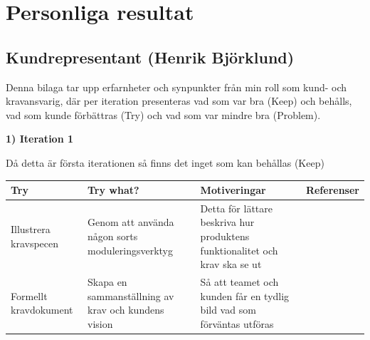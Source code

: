 \documentclass[conference,a4paper]{IEEEtran}
\newcommand\Tstrut{\rule{0pt}{2.6ex}}       %
\newcommand\Bstrut{\rule[-0.9ex]{0pt}{0pt}} %
\newcommand{\TBstrut}{\Tstrut\Bstrut} %
\begin{document}


%
%
%







\appendices
\section{Personliga resultat}

\subsection{Kundrepresentant (Henrik Björklund)}
Denna bilaga tar upp erfarnheter och synpunkter från min roll som kund- och kravansvarig, där per iteration presenteras vad som var bra (Keep) och behålls, vad som kunde förbättras (Try) och vad som var mindre bra (Problem).

\textbf{1) Iteration 1}

Då detta är första iterationen så finns det inget som kan behållas (Keep)

\begin{table}[H]
	\small
  \centering
	\begin{tabular}{|p{1.5cm}|p{2cm}|p{1.8cm}|p{1.5cm}|} %
    \hline
    Try & Try what? & Motiveringar & Referenser \TBstrut \\
    \hline
     Illustrera kravspecen & Genom att använda någon sorts moduleringsverktyg & Detta för lättare beskriva hur produktens funktionalitet och krav ska se ut  & \TBstrut \\
    \hline
     Formellt kravdokument & Skapa en sammanställning av krav och kundens vision & Så att teamet och kunden får en tydlig bild vad som förväntas utföras  & \TBstrut \\
    \hline 
  \end{tabular}
\end{table}
\end{document}

